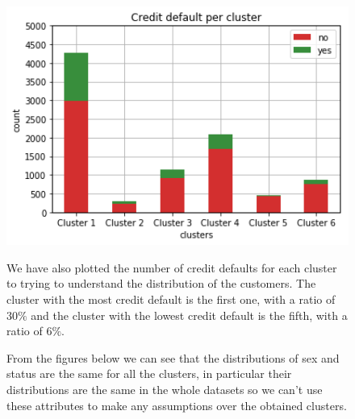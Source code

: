 \begin{figure}[h]
    \begin{minipage}[h]{.50\textwidth}
    \includegraphics[width=1\textwidth]{img/ch3/kmeans_default}

  \end{minipage}
  \begin{minipage}[h]{.50\textwidth}
    
    We have also plotted the number of credit defaults for each cluster to trying to understand the distribution of the customers. The cluster with the most credit default is the first one, with a ratio of $30\%$ and the cluster with the lowest credit default is the fifth, with a ratio of $6\%$.

  From the figures below we can see that the distributions of sex and status are the same for all the clusters, in particular their distributions are the same in the whole datasets so we can't use these attributes to make any assumptions over the obtained clusters.
      \end{minipage}
\end{figure}

